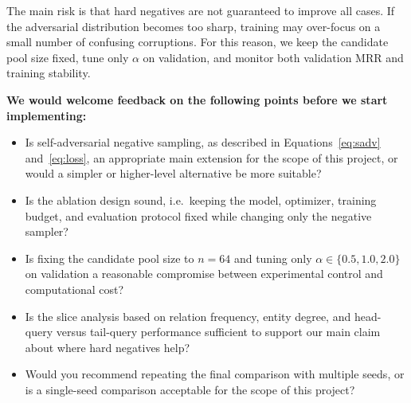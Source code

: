 \documentclass{llncs}
\begin{document}
The main risk is that hard negatives are not guaranteed to improve all
cases.
If the adversarial distribution becomes too sharp, training may over-focus
on a small number of confusing corruptions.
For this reason, we keep the candidate pool size fixed, tune only
$\alpha$ on validation, and monitor both validation MRR and training
stability.

\medskip\noindent
\textbf{We would welcome feedback on the following points before we start
implementing:}
\begin{itemize}
  \item Is self-adversarial negative sampling, as described in
        Equations~\ref{eq:sadv} and~\ref{eq:loss}, an appropriate main
        extension for the scope of this project, or would a simpler or
        higher-level alternative be more suitable?
  \item Is the ablation design sound, i.e.\ keeping the model, optimizer,
        training budget, and evaluation protocol fixed while changing only
        the negative sampler?
  \item Is fixing the candidate pool size to $n=64$ and tuning only
        $\alpha\in\{0.5,1.0,2.0\}$ on validation a reasonable compromise
        between experimental control and computational cost?
  \item Is the slice analysis based on relation frequency, entity degree,
        and head-query versus tail-query performance sufficient to support
        our main claim about where hard negatives help?
  \item Would you recommend repeating the final comparison with multiple
        seeds, or is a single-seed comparison acceptable for the scope of
        this project?
\end{itemize}
\end{document}
